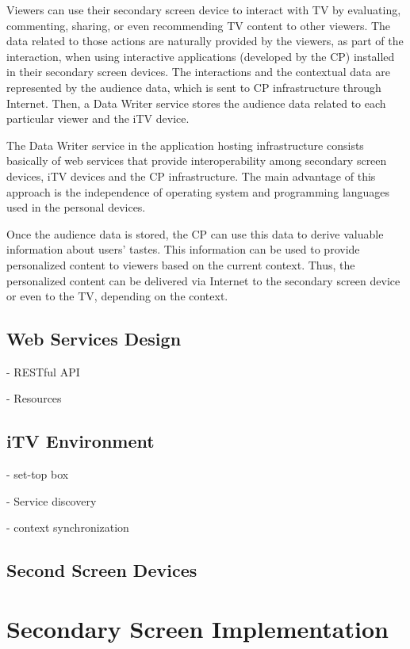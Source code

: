 \documentclass[journal]{IEEEtran}
\begin{document}
Viewers can use their secondary screen device to interact with TV by evaluating, commenting, sharing, or even recommending TV content to other viewers. The data related to those actions are naturally provided by the viewers, as part of the interaction, when using interactive applications (developed by the CP) installed in their secondary screen devices. The interactions and the contextual data are represented by the audience data, which is sent to CP infrastructure through Internet. Then, a Data Writer service stores the audience data related to each particular viewer and the iTV device.

The Data Writer service in the application hosting infrastructure consists basically of web services that provide interoperability among secondary screen devices, iTV devices and the CP infrastructure. The main advantage of this approach is the independence of operating system and programming languages used in the personal devices.

Once the audience data is stored, the CP can use this data to derive valuable information about users' tastes. This information can be used to provide personalized content to viewers based on the current context. Thus, the personalized content can be delivered via Internet to the secondary screen device or even to the TV, depending on the context.

\subsection{Web Services Design}

- RESTful API

- Resources

\subsection{iTV Environment}

- set-top box

- Service discovery

- context synchronization

\subsection{Second Screen Devices}

\section{Secondary Screen Implementation}
\end{document}
